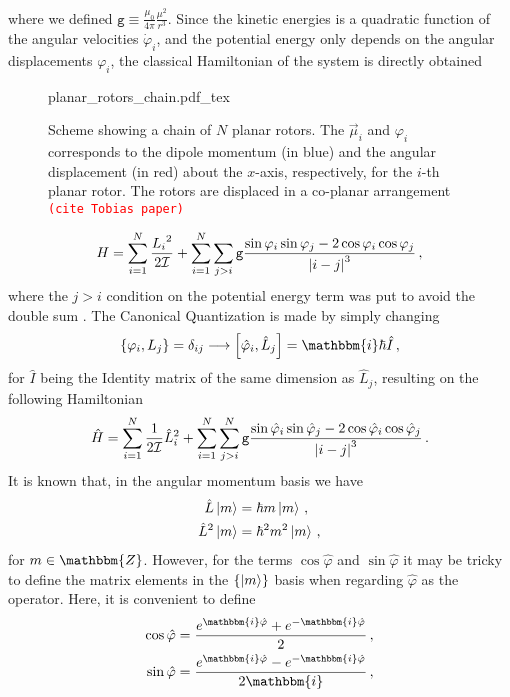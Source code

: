 \documentclass[a4paper,11pt]{article}
\newcommand{\incfig}[1]{%
	\def\svgwidth{\columnwidth}
	{#1.pdf_tex}
}
\newcommand\alert[1]{{\texttt{\textcolor{Red}{(#1)}}}}
\newcommand{\oper}[1]{\hat{#1}}
\newcommand{\1}{{\oper{I}}}
\renewcommand{\i}{{\mathbbm{i}}}
\renewcommand{\d}[1]{{\delta_{#1}}}
\newcommand{\Zmath}{\mathbbm{Z}}
\newcommand{\+}{\uparrow}
\renewcommand{\-}{\downarrow}
\newcommand{\0}{0}
\begin{document}
where we defined $\texttt{g} \equiv \frac{\mu_0}{4\pi} \frac{\mu^2}{r^3}$. Since the kinetic energies is a quadratic function of the angular velocities $\dot{\varphi}_i$, and the potential energy only depends on the angular displacements ${\varphi}_i$, the classical Hamiltonian of the system is directly obtained
\begin{figure}[ht]
	\centering
	\incfig{planar_rotors_chain}
	\caption{Scheme showing a chain of $N$ planar rotors. The $\vec{\mu}_i$ and $\varphi_i$ corresponds to the dipole momentum (in blue) and the angular displacement (in red) about the $x$-axis, respectively, for the $i$-th planar rotor. The rotors are displaced in a co-planar arrangement \alert{cite Tobias paper}}
	\label{fig:planar_rotors_chain}
\end{figure}
\begin{align}
	H = \sum_{i=1}^{N} \frac{{L_i}^2}{2\mathcal{I}} + \sum_{i=1}^{N}\sum_{j>i}\texttt{g}\frac{\sin{\varphi_i} \sin{\varphi_j} -2\cos{\varphi_i} \cos{\varphi_j}}{\abs{i-j}^3} \, ,
\end{align}
where the $j>i$ condition on the potential energy term was put to avoid the double sum \cite{lemos2018analytical}. The Canonical Quantization is made by simply changing
\begin{align}
	\{\varphi_i,L_j\} = \d{ij} \longrightarrow \comm{\oper{\varphi}_i}{\oper{L}_j} = \i \hbar \1 \, ,
\end{align}
for $\1$ being the Identity matrix of the same dimension as $\oper{L}_j$, resulting on the following Hamiltonian	
\begin{align}
	\label{eq:Hamiltonian}
	\oper{H} = \sum_{i=1}^{N} \frac{1}{2\mathcal{I}} \oper{L}_i^2 + \sum_{i=1}^{N}\sum_{j>i}^{N}\texttt{g}\frac{\sin{\oper{\varphi}_i}\sin{\oper{\varphi}_j} - 2\cos{\oper{\varphi}_i}\cos{\oper{\varphi}_j}}{\abs{i-j}^3} \, .
\end{align}
It is known that, in the angular momentum basis we have
\begin{align}
	\oper{L}\ket{m} &= \hbar m \ket{m} \, , \\
	\oper{L}^2\ket{m} &= \hbar^2 m^2 \ket{m} \, ,
\end{align}
for $m \in \Zmath$. However, for the terms $\cos{\oper{\varphi}}$ and $\sin{\oper{\varphi}}$ it may be tricky to define the matrix elements in the $\{\ket{m}\}$ basis when regarding $\oper{\varphi}$ as the operator. Here, it is convenient to define
\begin{align}
	\cos{\oper{\varphi}} &= \frac{e^{\i \oper{\varphi}}+e^{-\i \oper{\varphi}}}{2} \, , \\
	\sin{\oper{\varphi}} &= \frac{e^{\i \oper{\varphi}}-e^{-\i \oper{\varphi}}}{2\i} \, ,
\end{align}
\end{document}
